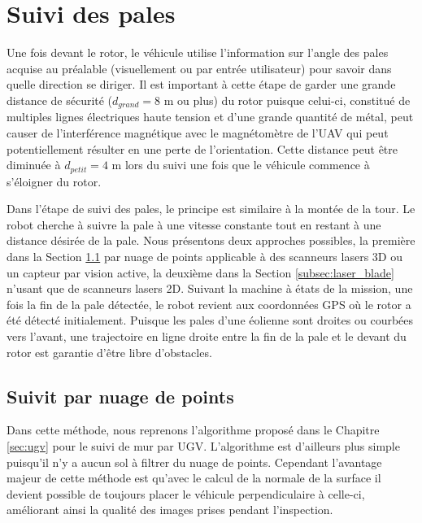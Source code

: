 \section{Suivi des pales}

Une fois devant le rotor, le véhicule utilise l'information sur l'angle des pales acquise au préalable (visuellement ou par entrée utilisateur) pour savoir dans quelle direction se diriger. Il est important à cette étape de garder une grande distance de sécurité ($d_{grand} = 8$ m ou plus) du rotor puisque celui-ci, constitué de multiples lignes électriques haute tension et d'une grande quantité de métal, peut causer de l'interférence magnétique avec le magnétomètre de l'UAV qui peut potentiellement résulter en une perte de l'orientation. Cette distance peut être diminuée à $d_{petit} = 4$ m lors du suivi une fois que le véhicule commence à s'éloigner du rotor.

Dans l'étape de suivi des pales, le principe est similaire à la montée de la tour. Le robot cherche à suivre la pale à une vitesse constante tout en restant à une distance désirée de la pale. Nous présentons deux approches possibles, la première dans la Section \ref{subsec:pcl_blade} par nuage de points applicable à des scanneurs lasers 3D ou un capteur par vision active, la deuxième dans la Section \ref{subsec:laser_blade} n'usant que de scanneurs lasers 2D.
Suivant la machine à états de la mission, une fois la fin de la pale détectée, le robot revient aux coordonnées GPS où le rotor a été détecté initialement. Puisque les pales d'une éolienne sont droites ou courbées vers l'avant, une trajectoire en ligne droite entre la fin de la pale et le devant du rotor est garantie d'être libre d'obstacles.

\subsection{Suivit par nuage de points}
\label{subsec:pcl_blade}

Dans cette méthode, nous reprenons l'algorithme proposé dans le Chapitre \ref{sec:ugv} pour le suivi de mur par UGV. L'algorithme est d'ailleurs plus simple puisqu'il n'y a aucun sol à filtrer du nuage de points. Cependant l'avantage majeur de cette méthode est qu’avec le calcul de la normale de la surface il devient possible de toujours placer le véhicule perpendiculaire à celle-ci, améliorant ainsi la qualité des images prises pendant l'inspection.


